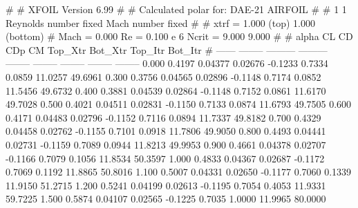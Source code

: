 #  
#       XFOIL         Version 6.99
#  
# Calculated polar for: DAE-21 AIRFOIL                                  
#  
# 1 1 Reynolds number fixed          Mach number fixed         
#  
# xtrf =   1.000 (top)        1.000 (bottom)  
# Mach =   0.000     Re =     0.100 e 6     Ncrit =   9.000  9.000
#  
#   alpha    CL        CD       CDp       CM     Top_Xtr  Bot_Xtr  Top_Itr  Bot_Itr
#  ------ -------- --------- --------- -------- -------- -------- -------- --------
   0.000   0.4197   0.04377   0.02676  -0.1233   0.7334   0.0859  11.0257  49.6961
   0.300   0.3756   0.04565   0.02896  -0.1148   0.7174   0.0852  11.5456  49.6732
   0.400   0.3881   0.04539   0.02864  -0.1148   0.7152   0.0861  11.6170  49.7028
   0.500   0.4021   0.04511   0.02831  -0.1150   0.7133   0.0874  11.6793  49.7505
   0.600   0.4171   0.04483   0.02796  -0.1152   0.7116   0.0894  11.7337  49.8182
   0.700   0.4329   0.04458   0.02762  -0.1155   0.7101   0.0918  11.7806  49.9050
   0.800   0.4493   0.04441   0.02731  -0.1159   0.7089   0.0944  11.8213  49.9953
   0.900   0.4661   0.04378   0.02707  -0.1166   0.7079   0.1056  11.8534  50.3597
   1.000   0.4833   0.04367   0.02687  -0.1172   0.7069   0.1192  11.8865  50.8016
   1.100   0.5007   0.04331   0.02650  -0.1177   0.7060   0.1339  11.9150  51.2715
   1.200   0.5241   0.04199   0.02613  -0.1195   0.7054   0.4053  11.9331  59.7225
   1.500   0.5874   0.04107   0.02565  -0.1225   0.7035   1.0000  11.9965  80.0000
